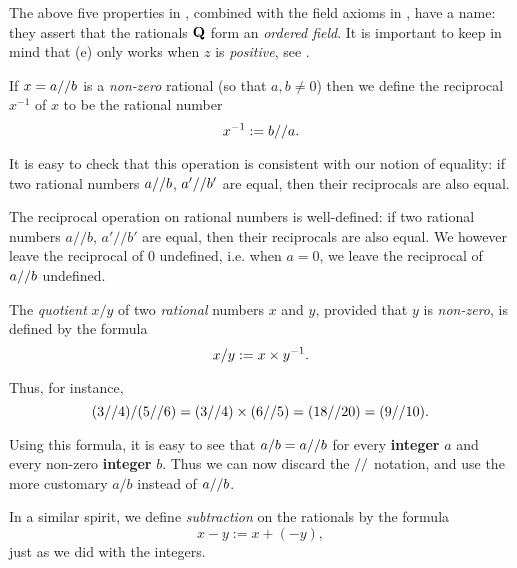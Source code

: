 \begin{remark} \label{remark 4.2.10}
The above five properties in , combined with the field axioms in , have a name:
they assert that the rationals \(\mathbf{Q}\) form an \emph{ordered field}.
It is important to keep in mind that (e) only works when \(z\) is \emph{positive}, see .
\end{remark}

\begin{definition} [Reciprocal] \label{def 4.1.11}
If \(x = a \text{//} b\) is a \emph{non-zero} rational (so that \(a, b \neq 0\)) then we define the reciprocal \(x^{-1}\) of \(x\) to be the rational number
\[
    x^{-1} := b \text{//} a.
\]
\end{definition}

It is easy to check that this operation is consistent with our notion of equality: if two rational numbers \(a \text{//} b\), \(a' \text{//} b'\) are equal, then their reciprocals are also equal.
\begin{additional corollary} \label{ac 4.2.4}
The reciprocal operation on rational numbers is well-defined:
if two rational numbers \(a // b\), \(a' // b'\) are equal, then their reciprocals are also equal.
We however leave the reciprocal of \(0\) undefined, i.e. when \(a = 0\), we leave the reciprocal of \(a \text{//} b\) undefined.
\end{additional corollary}

\begin{definition} [Quotient] \label{def 4.2.12}
The \emph{quotient} \(x / y\) of two \emph{rational} numbers \(x\) and \(y\), provided that \(y\) is \emph{non-zero}, is defined by the formula
\[
    x / y := x \times y^{-1}.
\]
\end{definition}
Thus, for instance,
\[
    (3 \text{//} 4) / (5 \text{//} 6) = (3 \text{//} 4) \times (6 \text{//} 5) = (18 \text{//} 20) = (9 \text{//} 10).
\]

Using this formula, it is easy to see that \(a / b = a \text{//} b\) for every \textbf{integer} \(a\) and every non-zero \textbf{integer} \(b\).
Thus we can now discard the \(\text{//}\) notation, and use the more customary \(a / b\) instead of \(a \text{//} b\).

\begin{definition} \label{def 4.2.13}
In a similar spirit, we define \emph{subtraction} on the rationals by the formula
\[
    x - y := x + (-y),
\]
just as we did with the integers.
\end{definition}

\exercisesection

